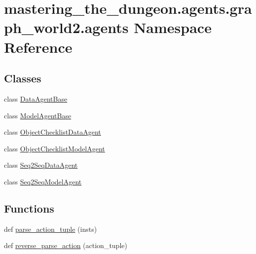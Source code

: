 \hypertarget{namespacemastering__the__dungeon_1_1agents_1_1graph__world2_1_1agents}{}\section{mastering\+\_\+the\+\_\+dungeon.\+agents.\+graph\+\_\+world2.\+agents Namespace Reference}
\label{namespacemastering__the__dungeon_1_1agents_1_1graph__world2_1_1agents}
\subsection*{Classes}
\begin{DoxyCompactItemize}
\item 
class \hyperlink{classmastering__the__dungeon_1_1agents_1_1graph__world2_1_1agents_1_1DataAgentBase}{Data\+Agent\+Base}
\item 
class \hyperlink{classmastering__the__dungeon_1_1agents_1_1graph__world2_1_1agents_1_1ModelAgentBase}{Model\+Agent\+Base}
\item 
class \hyperlink{classmastering__the__dungeon_1_1agents_1_1graph__world2_1_1agents_1_1ObjectChecklistDataAgent}{Object\+Checklist\+Data\+Agent}
\item 
class \hyperlink{classmastering__the__dungeon_1_1agents_1_1graph__world2_1_1agents_1_1ObjectChecklistModelAgent}{Object\+Checklist\+Model\+Agent}
\item 
class \hyperlink{classmastering__the__dungeon_1_1agents_1_1graph__world2_1_1agents_1_1Seq2SeqDataAgent}{Seq2\+Seq\+Data\+Agent}
\item 
class \hyperlink{classmastering__the__dungeon_1_1agents_1_1graph__world2_1_1agents_1_1Seq2SeqModelAgent}{Seq2\+Seq\+Model\+Agent}
\end{DoxyCompactItemize}
\subsection*{Functions}
\begin{DoxyCompactItemize}
\item 
def \hyperlink{namespacemastering__the__dungeon_1_1agents_1_1graph__world2_1_1agents_ad9e3cbf482daba14ab6d0a026fb0ba24}{parse\+\_\+action\+\_\+tuple} (insts)
\item 
def \hyperlink{namespacemastering__the__dungeon_1_1agents_1_1graph__world2_1_1agents_a737eae4762bdf8ae4c5051bbfd7b783d}{reverse\+\_\+parse\+\_\+action} (action\+\_\+tuple)
\end{DoxyCompactItemize}
